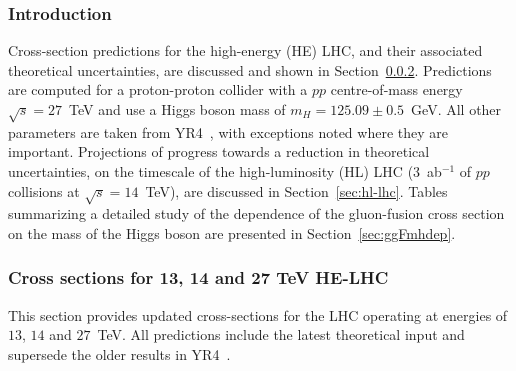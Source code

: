 \quad\quad\quad{}

 
\subsubsection{Introduction}

Cross-section predictions for the high-energy (HE) LHC, and their associated theoretical uncertainties, are discussed and shown in
Section~\ref{sec:he-lhc}. Predictions are computed for a proton-proton collider with a $pp$ centre-of-mass
energy $\sqrt{s}=27$~TeV and use a Higgs
boson mass of $m_H=125.09 \pm 0.5$~GeV.   All other parameters are taken from YR4~\cite{deFlorian:2016spz},
with exceptions noted where they are important.  
Projections of progress towards a reduction in theoretical uncertainties, on the timescale
of the high-luminosity (HL) LHC (3~ab$^{-1}$ of $pp$ collisions at $\sqrt{s}=14$~TeV), are discussed in Section~\ref{sec:hl-lhc}. 
Tables summarizing a detailed study of the dependence of the gluon-fusion cross section on the mass of the Higgs boson
are presented in Section~\ref{sec:ggFmhdep}.

\subsubsection{Cross sections for 13, 14 and 27 TeV HE-LHC}
\label{sec:he-lhc}

This section provides updated cross-sections for the LHC operating at
energies of $13$, $14$ and $27$~TeV.  All predictions include the latest 
theoretical input and supersede the older results in YR4~\cite{deFlorian:2016spz}.

